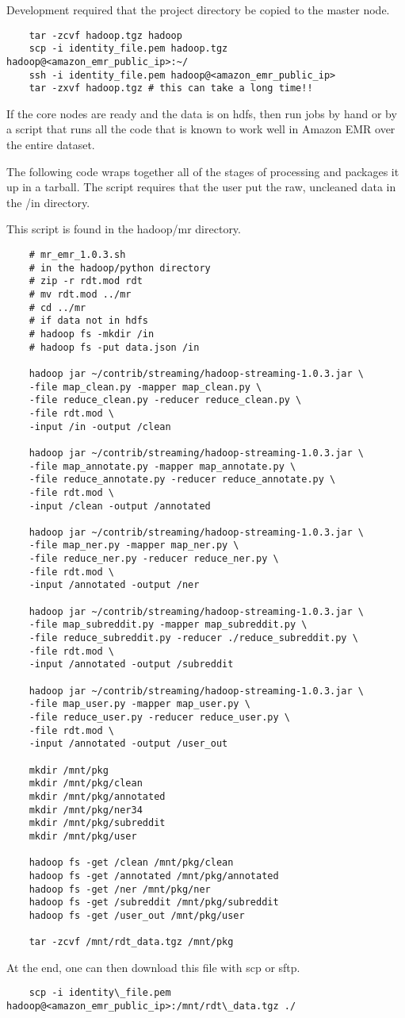 \documentclass[12pt,a4paper]{article}
\begin{document}
Development required that the project directory be copied to the master node.

\begin{lstlisting}
	tar -zcvf hadoop.tgz hadoop
	scp -i identity_file.pem hadoop.tgz hadoop@<amazon_emr_public_ip>:~/
	ssh -i identity_file.pem hadoop@<amazon_emr_public_ip>
	tar -zxvf hadoop.tgz # this can take a long time!!
\end{lstlisting}

If the core nodes are ready and the data is on hdfs, then run 
jobs by hand or by a script that runs all the code that is known
to work well in Amazon EMR over the entire dataset.

The following code wraps together all of the stages
of processing and packages it up in a tarball. The
script requires that the user put the raw, uncleaned
data in the /in directory.

This script is found in the hadoop/mr directory.

\begin{lstlisting}
	# mr_emr_1.0.3.sh
	# in the hadoop/python directory
	# zip -r rdt.mod rdt
	# mv rdt.mod ../mr
	# cd ../mr
	# if data not in hdfs
	# hadoop fs -mkdir /in
	# hadoop fs -put data.json /in
	
	hadoop jar ~/contrib/streaming/hadoop-streaming-1.0.3.jar \
	-file map_clean.py -mapper map_clean.py \
	-file reduce_clean.py -reducer reduce_clean.py \
	-file rdt.mod \
	-input /in -output /clean

	hadoop jar ~/contrib/streaming/hadoop-streaming-1.0.3.jar \
	-file map_annotate.py -mapper map_annotate.py \
	-file reduce_annotate.py -reducer reduce_annotate.py \
	-file rdt.mod \
	-input /clean -output /annotated

	hadoop jar ~/contrib/streaming/hadoop-streaming-1.0.3.jar \
	-file map_ner.py -mapper map_ner.py \
	-file reduce_ner.py -reducer reduce_ner.py \
	-file rdt.mod \
	-input /annotated -output /ner

	hadoop jar ~/contrib/streaming/hadoop-streaming-1.0.3.jar \
	-file map_subreddit.py -mapper map_subreddit.py \
	-file reduce_subreddit.py -reducer ./reduce_subreddit.py \
	-file rdt.mod \
	-input /annotated -output /subreddit

	hadoop jar ~/contrib/streaming/hadoop-streaming-1.0.3.jar \
	-file map_user.py -mapper map_user.py \
	-file reduce_user.py -reducer reduce_user.py \
	-file rdt.mod \
	-input /annotated -output /user_out

	mkdir /mnt/pkg
	mkdir /mnt/pkg/clean
	mkdir /mnt/pkg/annotated
	mkdir /mnt/pkg/ner34
	mkdir /mnt/pkg/subreddit
	mkdir /mnt/pkg/user

	hadoop fs -get /clean /mnt/pkg/clean
	hadoop fs -get /annotated /mnt/pkg/annotated
	hadoop fs -get /ner /mnt/pkg/ner
	hadoop fs -get /subreddit /mnt/pkg/subreddit
	hadoop fs -get /user_out /mnt/pkg/user

	tar -zcvf /mnt/rdt_data.tgz /mnt/pkg

\end{lstlisting}

At the end, one can then download this file
with scp or sftp.

\begin{lstlisting}
	scp -i identity\_file.pem hadoop@<amazon_emr_public_ip>:/mnt/rdt\_data.tgz ./
\end{lstlisting}
\end{document}
